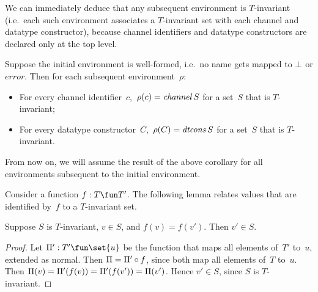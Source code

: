 
We can immediately deduce that any subsequent environment is $T$-invariant
(i.e.~each such environment associates a $T$-invariant set with each channel
and datatype constructor), because channel identifiers and datatype
constructors are declared only at the top level.
%
\begin{corollary}
\label{cor:invariant}
Suppose the initial environment is well-formed, i.e.~no name gets mapped to
$\perp$ or $error$.  Then for each subsequent environment~$\rho$:
\begin{itemize}
\item For every channel identifier~$c$,\, $\rho(c) = \mathop{\it channel} S$ for a set~$S$
  that is $T$-invariant;

\item For every datatype constructor~$C$,\, $\rho(C) = \mathop{\it dtcons} S$ for a
  set~$S$ that is $T$-invariant.
\end{itemize}
\end{corollary}
%
From now on, we will assume the result of the above corollary for all
environments subsequent to the initial environment. 


Consider a function $f: T \fun T'$.  The following lemma relates values that
are identified by~$f$ to a $T$-invariant set. 



\begin{lemma}
\label{lem:T-invariant-vs-f}
Suppose $S$ is $T$-invariant, $v \in S$, and $f(v) = f(v')$.  Then $v' \in S$.
\end{lemma}
%
\begin{proof}
Let $\unitf' : T' \fun \set{u}$ be the function that maps all elements
of~$T'$ to~$u$, extended as normal.  Then $\Pi = \Pi' \circ f$, since
both map all elements of~$T$ to~$u$.  Then $\Pi(v) = \Pi'(f(v)) =
\Pi'(f(v')) = \Pi(v')$.  Hence $v' \in S$, since $S$ is $T$-invariant.
\end{proof}

